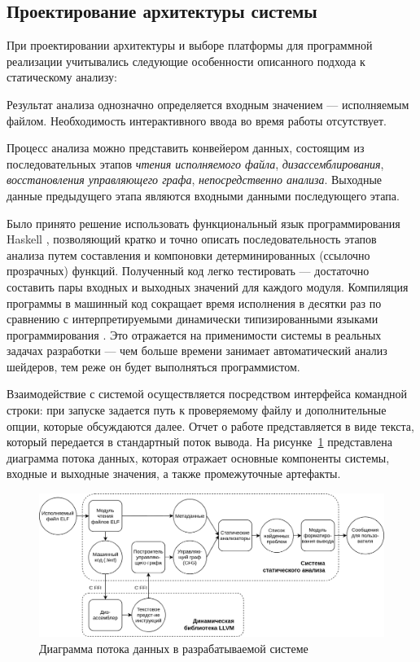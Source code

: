 \documentclass[a4paper,14pt]{extarticle}
\begin{document}
{\subsection{Проектирование архитектуры системы}
\label{section:system-design}

При проектировании архитектуры и выборе платформы для программной реализации
учитывались следующие особенности описанного подхода к статическому анализу:
\begin{ul}
\item Результат анализа однозначно определяется входным значением —
исполняемым файлом. Необходимость интерактивного ввода во время работы отсутствует.
\item Процесс анализа можно представить конвейером данных, состоящим из
последовательных этапов \textit{чтения исполняемого файла}, \textit{дизассемблирования},
\textit{восстановления управляющего графа}, \textit{непосредственно анализа}.
Выходные данные предыдущего этапа являются входными данными последующего этапа.
\end{ul}

Было принято решение использовать функциональный язык программирования Haskell
\cite{haskell}, позволяющий кратко и точно описать последовательность этапов анализа
путем составления и компоновки детерминированных (ссылочно прозрачных) функций.
Полученный код легко тестировать — достаточно составить пары входных и выходных
значений для каждого модуля. Компиляция программы в машинный код сокращает время
исполнения в десятки раз по сравнению с интерпретируемыми динамически типизированными
языками программирования \cite{rwhaskell}. Это отражается на применимости системы в
реальных задачах разработки — чем больше времени занимает автоматический анализ шейдеров,
тем реже он будет выполняться программистом.

Взаимодействие с системой осуществляется посредством интерфейса командной строки: при
запуске задается путь к проверяемому файлу и дополнительные опции, которые обсуждаются
далее. Отчет о работе представляется в виде текста, который передается в стандартный поток
вывода. На рисунке~\ref{fig:diagram-arch} представлена диаграмма потока данных,
которая отражает основные компоненты системы, входные и выходные значения,
а также промежуточные артефакты.

\begin{figure}[H]
\centering
\includegraphics[width=1.01\textwidth]{diagrams/arch}
\caption{Диаграмма потока данных в разрабатываемой системе}
\label{fig:diagram-arch}
\end{figure}

}
\end{document}
